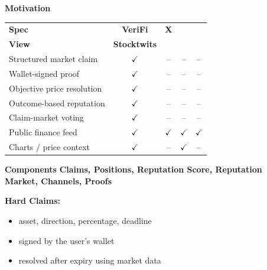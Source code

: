 \documentclass[final]{beamer}
\newlength{\sepwidth}
\newlength{\colwidth}
\newcommand{\separatorcolumn}{\begin{column}{\sepwidth}\end{column}}
\newcommand{\blocktitleformat}[1]{%
  {\fontsize{42}{48}\selectfont\bfseries #1}%
}
\newcommand{\subtitleformat}[1]{%
  {\fontsize{36pt}{43pt}\selectfont\color{blue!60!black}\textbf{#1}}%
}
\newcommand{\tick}{\textcolor{blue!60!black}{\(\checkmark\)}}
\newcommand{\dash}{\textcolor{black!35}{--}}
\begin{document}
\begin{frame}[t]
\begin{columns}[t]
\begin{column}{\colwidth}
\begin{block}{\blocktitleformat{Motivation}}
    \vspace{0.8cm}
    \begin{table}
      \centering
      \renewcommand{\arraystretch}{1.13}
      \begin{tabularx}{\linewidth}{@{}>{\raggedright\arraybackslash}Xcccc@{}}
        \toprule
        \textbf{Spec} & \textbf{VeriFi} & \textbf{X} & \makecell{\textbf{Trading}\\\textbf{View}} & \textbf{Stocktwits} \\
        \midrule
        Structured market claim & \tick & \dash & \dash & \dash \\
        Wallet-signed proof & \tick & \dash & \dash & \dash \\
        Objective price resolution & \tick & \dash & \dash & \dash \\
        Outcome-based reputation & \tick & \dash & \dash & \dash \\
        Claim-market voting & \tick & \dash & \dash & \dash \\
        Public finance feed & \tick & \tick & \tick & \tick \\
        Charts / price context & \tick & \dash & \tick & \dash \\
        \bottomrule
      \end{tabularx}
    \end{table}
  \end{block}

  \begin{block}{\blocktitleformat{Components}}
    \textbf{Claims, Positions, Reputation Score, Reputation Market, Channels, Proofs}

    \vspace{0.8cm}
    \subtitleformat{Hard Claims:}
    \begin{itemize}
      \item asset, direction, percentage, deadline
      \item signed by the user's wallet
      \item resolved after expiry using market data
    \end{itemize}
  \end{block}

\end{column}

\separatorcolumn

\begin{column}{\colwidth}


\end{column}
\end{columns}
\end{frame}
\end{document}
